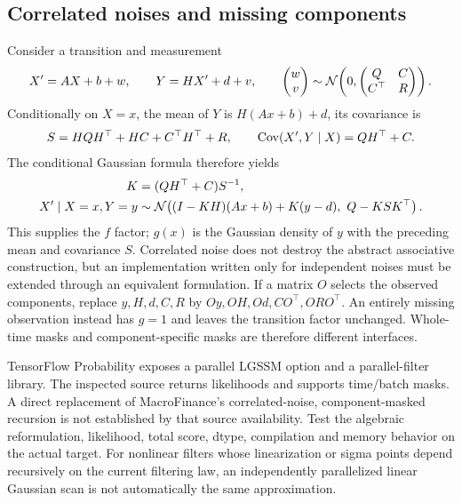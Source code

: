 \subsection{Correlated noises and missing components}

Consider a transition and measurement
\begin{equation}
 X'=AX+b+w,\qquad Y=HX'+d+v,\qquad
 \begin{pmatrix}w\\v\end{pmatrix}
 \sim\mathcal{N}\!\left(0,
 \begin{pmatrix}Q&C\\C^\top&R\end{pmatrix}\right).
 \label{eq:bf-modern-correlated-ssm}
\end{equation}
Conditionally on $X=x$, the mean of $Y$ is $H(Ax+b)+d$, its covariance
is
\begin{equation}
 S=HQH^\top+HC+C^\top H^\top+R,\qquad
 \operatorname{Cov}(X',Y\mid X)=QH^\top+C.
 \label{eq:bf-modern-correlated-innovation}
\end{equation}
The conditional Gaussian formula therefore yields
\begin{align}
 K&=(QH^\top+C)S^{-1},\\
 X'\mid X=x,Y=y
 &\sim\mathcal{N}\!\left((I-KH)(Ax+b)+K(y-d),\ Q-KSK^\top\right).
 \label{eq:bf-modern-correlated-conditional}
\end{align}
This supplies the $f$ factor; $g(x)$ is the Gaussian density of $y$ with
the preceding mean and covariance $S$. Correlated noise does not destroy
the abstract associative construction, but an implementation written only
for independent noises must be extended through an equivalent formulation.
If a matrix $O$ selects the observed components, replace $y,H,d,C,R$ by
$Oy,OH,Od,CO^\top,ORO^\top$. An entirely missing observation instead has
$g=1$ and leaves the transition factor unchanged. Whole-time masks and
component-specific masks are therefore different interfaces.

TensorFlow Probability exposes a parallel LGSSM option and a parallel-filter
library. The inspected source returns likelihoods and supports time/batch
masks. A direct replacement of MacroFinance's correlated-noise,
component-masked recursion is not established by that source availability.
Test the algebraic reformulation, likelihood, total score, dtype, compilation
and memory behavior on the actual target. For nonlinear filters whose
linearization or sigma points depend recursively on the current filtering
law, an independently parallelized linear Gaussian scan is not automatically
the same approximation.

